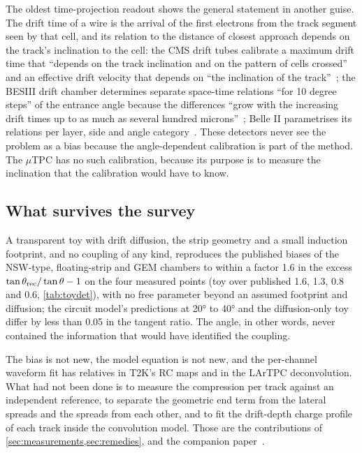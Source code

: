 The oldest time-projection readout shows the general statement in another guise. The drift time of a wire is the arrival of
the first electrons from the track segment seen by that cell, and its relation to the distance of closest approach depends on
the track's inclination to the cell: the CMS drift tubes calibrate a maximum drift time that ``depends on the track inclination
and on the pattern of cells crossed'' and an effective drift velocity that depends on ``the inclination of the
track''~\cite{CMSDT2010}; the BESIII drift chamber determines separate space-time relations ``for 10 degree steps'' of the entrance
angle because the differences ``grow with the increasing drift times up to as much as several hundred microns''~\cite{BESIIIMDC2014};
Belle II parametrises its relations per layer, side and angle category~\cite{BelleIICDC2019}. These detectors never see the
problem as a bias because the angle-dependent calibration is part of the method. The $\mu$TPC has no such calibration, because
its purpose is to measure the inclination that the calibration would have to know.

\subsection{What survives the survey}

A transparent toy with drift diffusion, the strip geometry and a small induction footprint, and no coupling of any kind,
reproduces the published biases of the NSW-type, floating-strip and GEM chambers to within a factor 1.6 in the excess
$\tan\theta_{\rm rec}/\tan\theta - 1$ on the four measured points (toy over published 1.6, 1.3, 0.8 and 0.6, \cref{tab:toydet}), with no
free parameter beyond an assumed footprint and diffusion; the circuit model's predictions at \ang{20} to \ang{40} and the diffusion-only toy differ by
less than 0.05 in the tangent ratio. The angle, in other words, never contained the information that would have identified
the coupling.

The bias is not new, the model equation is not new, and the per-channel waveform fit has relatives in T2K's RC maps and in the
LArTPC deconvolution. What had not been done is to measure the compression per track against an independent reference, to
separate the geometric end term from the lateral spreads and the spreads from each other, and to fit the drift-depth charge
profile of each track inside the convolution model. Those are the contributions of \cref{sec:measurements,sec:remedies}, and the
companion paper~\cite{paperII}.

